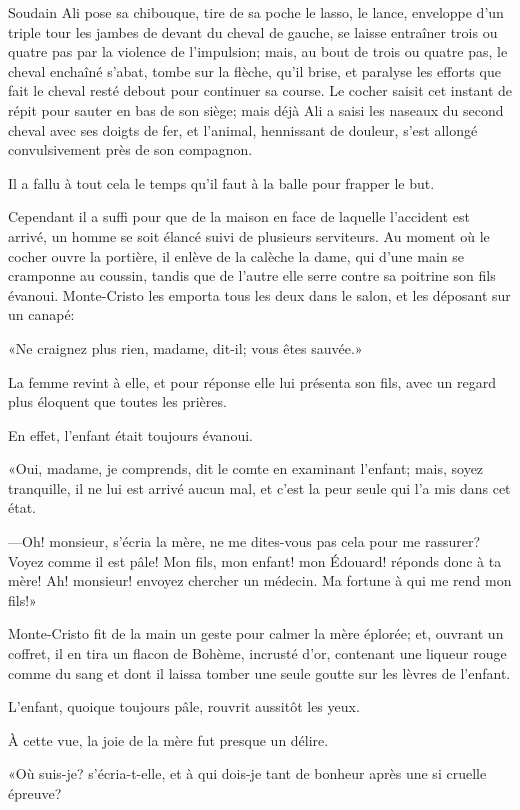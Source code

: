 Soudain Ali pose sa chibouque, tire de sa poche le lasso, le lance, enveloppe d'un triple tour les jambes de devant du cheval de gauche, se laisse entraîner trois ou quatre pas par la violence de l'impulsion; mais, au bout de trois ou quatre pas, le cheval enchaîné s'abat, tombe sur la flèche, qu'il brise, et paralyse les efforts que fait le cheval resté debout pour continuer sa course. Le cocher saisit cet instant de répit pour sauter en bas de son siège; mais déjà Ali a saisi les naseaux du second cheval avec ses doigts de fer, et l'animal, hennissant de douleur, s'est allongé convulsivement près de son compagnon. 

Il a fallu à tout cela le temps qu'il faut à la balle pour frapper le but. 

Cependant il a suffi pour que de la maison en face de laquelle l'accident est arrivé, un homme se soit élancé suivi de plusieurs serviteurs. Au moment où le cocher ouvre la portière, il enlève de la calèche la dame, qui d'une main se cramponne au coussin, tandis que de l'autre elle serre contre sa poitrine son fils évanoui. Monte-Cristo les emporta tous les deux dans le salon, et les déposant sur un canapé: 

«Ne craignez plus rien, madame, dit-il; vous êtes sauvée.» 

La femme revint à elle, et pour réponse elle lui présenta son fils, avec un regard plus éloquent que toutes les prières.  

En effet, l'enfant était toujours évanoui. 

«Oui, madame, je comprends, dit le comte en examinant l'enfant; mais, soyez tranquille, il ne lui est arrivé aucun mal, et c'est la peur seule qui l'a mis dans cet état. 

—Oh! monsieur, s'écria la mère, ne me dites-vous pas cela pour me rassurer? Voyez comme il est pâle! Mon fils, mon enfant! mon Édouard! réponds donc à ta mère! Ah! monsieur! envoyez chercher un médecin. Ma fortune à qui me rend mon fils!» 

Monte-Cristo fit de la main un geste pour calmer la mère éplorée; et, ouvrant un coffret, il en tira un flacon de Bohème, incrusté d'or, contenant une liqueur rouge comme du sang et dont il laissa tomber une seule goutte sur les lèvres de l'enfant. 

L'enfant, quoique toujours pâle, rouvrit aussitôt les yeux. 

À cette vue, la joie de la mère fut presque un délire. 

«Où suis-je? s'écria-t-elle, et à qui dois-je tant de bonheur après une si cruelle épreuve? 


